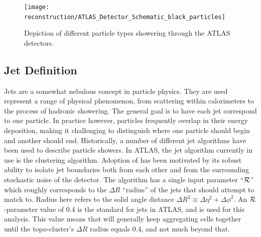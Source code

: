         \begin{figure}[tbh]
            \texttt{[image: reconstruction/ATLAS\_Detector\_Schematic\_black\_particles]}
            \caption{
                Depiction of different particle types showering through the ATLAS detectors\cite{Mehlhase:2770815}.
            }
            \label{fig:atlas_shower}
        \end{figure}


        \subsection{Jet Definition}
            
        Jets are a somewhat nebulous concept in particle physics.
        They are used represent a range of physical phenomenon,
            from scattering within calorimeters to the process of hadronic showering.
        The general goal is to have each jet correspond to one particle.
        In practice however, particles frequently overlap in their energy deposition,
            making it challenging to distinguish where one particle should begin and another should end.
        Historically, a number of different jet algorithms have been used to describe particle showers.
        In ATLAS, the jet algorithm currently in use is the \textit{\antikt} clustering algorithm\cite{anti_kt}.
        Adoption of \antikt has been motivated by its robust ability to isolate jet boundaries both from each other
            and from the surrounding stochastic noise of the detector.
        The \antikt algorithm has a single input parameter ``$\mathcal{R}$'' which roughly corresponds to the $\Delta R$ ``radius''
            of the jets that \antikt should attempt to match to.
        Radius here refers to the solid angle distance 
            $\Delta R^2 \equiv \Delta \eta^2 + \Delta \phi^2$.
        An $\mathcal{R}$-parameter value of 0.4 is the standard for jets in ATLAS, and is used for this analysis.
        This value means that \antikt will generally keep aggregating cells together until the topo-cluster's
            $\Delta R$ radius equals 0.4, and not much beyond that.


